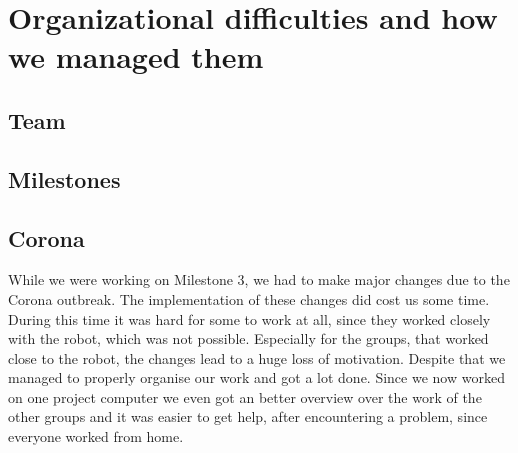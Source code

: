 \documentclass[main.tex]{subfiles}
\begin{document}
	\begingroup

	\renewcommand{\cleardoublepage}{}

	\renewcommand{\clearpage}{}

	\chapter{Organizational difficulties and how we managed them}

		
		\section{Team}
		
		
		\section{Milestones}
		
		\section{Corona}
	  	While we were working on Milestone 3, we had to make major changes due to the Corona outbreak. The implementation of these changes did cost us some time. During this time it was hard for some to work at all, since they worked closely with the robot, which was not possible.
	  	Especially for the groups, that worked close to the robot, the changes lead to a huge loss of motivation.
	  	Despite that we managed to properly organise our work and got a lot done.
	  	Since we now worked on one project computer we even got an better overview over the work of the other groups and it was easier to get help, after encountering a problem, since everyone worked from home.

	\endgroup
\end{document}
